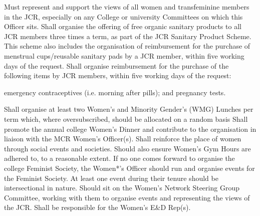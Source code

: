 Must represent and support the views of all women and transfeminine members in the JCR, especially on any College or university Committees on which this Officer sits.
Shall organise the offering of free organic sanitary products to all JCR members three times a term, as part of the JCR Sanitary Product Scheme. This scheme also includes the organisation of reimbursement for the purchase of menstrual cups/reusable sanitary pads by a JCR member, within five working days of the request.
Shall organise reimbursement for the purchase of the following items by JCR members, within five working days of the request:\begin{enumerate}
emergency contraceptives (i.e. morning after pills); and 
pregnancy tests.\end{enumerate}
Shall organise at least two Women's and Minority Gender's (WMG) Lunches per term which, where oversubscribed, should be allocated on a random basis
Shall promote the annual college Women's Dinner and contribute to the organisation in liaison with the MCR Women's Officer(s).
Shall reinforce the place of women through social events and societies. Should also ensure Women's Gym Hours are adhered to, to a reasonable extent. If no one comes forward to organise the college Feminist Society, the Women*'s Officer should run and organise events for the Feminist Society. At least one event during their tenure should be intersectional in nature.
Should sit on the Women's Network Steering Group Committee, working with them to organise events and representing the views of the JCR.
Shall be responsible for the Women's E\&D Rep(s).
